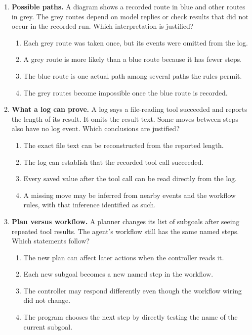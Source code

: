\begin{enumerate}[start=1,itemsep=0.7\baselineskip]
\item\label{exercise:7} \begin{minipage}[t]{\linewidth}
\textbf{Possible paths.} A diagram shows a recorded route in blue and other routes in grey. The grey routes depend on model replies or check results that did not occur in the recorded run. Which interpretation is justified?
\begin{enumerate}[label=\textnormal{(\Alph*)},leftmargin=*,itemsep=0pt]
\item Each grey route was taken once, but its events were omitted from the log.
\item A grey route is more likely than a blue route because it has fewer steps.
\item The blue route is one actual path among several paths the rules permit.
\item The grey routes become impossible once the blue route is recorded.
\end{enumerate}
\end{minipage}

\item\label{exercise:8} \begin{minipage}[t]{\linewidth}
\textbf{What a log can prove.} A log says a file-reading tool succeeded and reports the length of its result. It omits the result text. Some moves between steps also have no log event. Which conclusions are justified?
\begin{enumerate}[label=\textnormal{(\Alph*)},leftmargin=*,itemsep=0pt]
\item The exact file text can be reconstructed from the reported length.
\item The log can establish that the recorded tool call succeeded.
\item Every saved value after the tool call can be read directly from the log.
\item A missing move may be inferred from nearby events and the workflow rules, with that inference identified as such.
\end{enumerate}
\end{minipage}

\item\label{exercise:9} \begin{minipage}[t]{\linewidth}
\textbf{Plan versus workflow.} A planner changes its list of subgoals after seeing repeated tool results. The agent's workflow still has the same named steps. Which statements follow?
\begin{enumerate}[label=\textnormal{(\Alph*)},leftmargin=*,itemsep=0pt]
\item The new plan can affect later actions when the controller reads it.
\item Each new subgoal becomes a new named step in the workflow.
\item The controller may respond differently even though the workflow wiring did not change.
\item The program chooses the next step by directly testing the name of the current subgoal.
\end{enumerate}
\end{minipage}


\end{enumerate}
